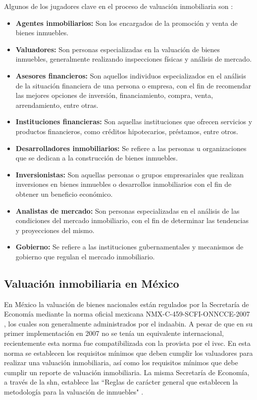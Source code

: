 Algunos de los jugadores clave en el proceso de valuación inmobiliaria son
\cite{pagourtzi2003}:

\begin{itemize}
  \item \textbf{Agentes inmobiliarios:} Son los encargados de la promoción y
  venta de bienes inmuebles.
  \item \textbf{Valuadores:} Son personas especializadas en la valuación de
  bienes inmuebles, generalmente realizando inspecciones físicas y análisis
  de mercado.
  \item \textbf{Asesores financieros:} Son aquellos individuos especializados
  en el análisis de la situación financiera de una persona o empresa, con el
  fin de recomendar las mejores opciones de inversión, financiamiento, compra,
  venta, arrendamiento, entre otras.
  \item \textbf{Instituciones financieras:} Son aquellas instituciones que
  ofrecen servicios y productos financieros, como créditos hipotecarios,
  préstamos, entre otros.
  \item \textbf{Desarrolladores inmobiliarios:} Se refiere a las personas u
  organizaciones que se dedican a la construcción de bienes inmuebles.
  \item \textbf{Inversionistas:} Son aquellas personas o grupos empresariales
  que realizan inversiones en bienes inmuebles o desarrollos inmobiliarios con
  el fin de obtener un beneficio económico.
  \item \textbf{Analistas de mercado:} Son personas especializadas en el
  análisis de las condiciones del mercado inmobiliario, con el fin de
  determinar las tendencias y proyecciones del mismo.
  \item \textbf{Gobierno:} Se refiere a las instituciones gubernamentales y
  mecanismos de gobierno que regulan el mercado inmobiliario.
\end{itemize}

\subsection{Valuación inmobiliaria en México}
En México la valuación de bienes nacionales están regulados por la Secretaría de
Economía mediante la norma oficial mexicana NMX-C-459-SCFI-ONNCCE-2007
\cite{nmx-c-459-scfi-onncce-2007}, los cuales son generalmente administrados por
el \acrfull{indaabin}. A pesar de que en su primer implementación en 2007 no se
tenía un equivalente internacional, recientemente esta norma
fue compatibilizada con la provista por el \acrfull{ivsc}. En esta norma se establecen los
requisitos mínimos que deben cumplir los valuadores para realizar una valuación
inmobiliaria, así como los requisitos mínimos que debe cumplir un reporte de
valuación inmobiliaria. La misma Secretaría de Economía, a través de la \acrfull{shn},
establece las ``Reglas de carácter general que establecen la metodología para la
valuación de inmuebles" \cite{salas2014valuacion}.

